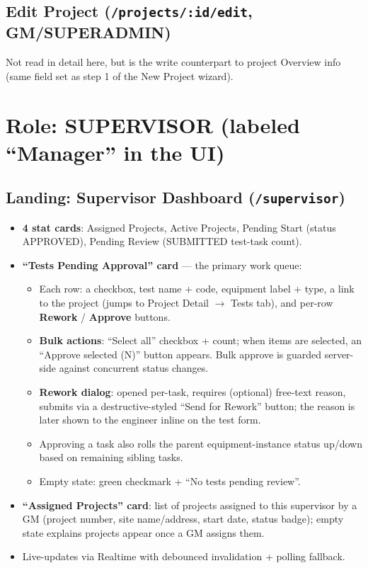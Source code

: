 \documentclass[11pt]{article}
\begin{document}
\subsection{Edit Project (\texttt{/projects/:id/edit}, GM/SUPERADMIN)}
Not read in detail here, but is the write counterpart to project Overview info (same field set as
step 1 of the New Project wizard).

\section{Role: SUPERVISOR (labeled ``Manager'' in the UI)}

\subsection{Landing: Supervisor Dashboard (\texttt{/supervisor})}
\begin{itemize}[nosep]
  \item \textbf{4 stat cards}: Assigned Projects, Active Projects, Pending Start (status
    APPROVED), Pending Review (SUBMITTED test-task count).
  \item \textbf{``Tests Pending Approval'' card} --- the primary work queue:
  \begin{itemize}[nosep]
    \item Each row: a checkbox, test name + code, equipment label + type, a link to the project
      (jumps to Project Detail $\to$ Tests tab), and per-row \textbf{Rework} / \textbf{Approve}
      buttons.
    \item \textbf{Bulk actions}: ``Select all'' checkbox + count; when items are selected, an
      ``Approve selected (N)'' button appears. Bulk approve is guarded server-side against
      concurrent status changes.
    \item \textbf{Rework dialog}: opened per-task, requires (optional) free-text reason, submits
      via a destructive-styled ``Send for Rework'' button; the reason is later shown to the
      engineer inline on the test form.
    \item Approving a task also rolls the parent equipment-instance status up/down based on
      remaining sibling tasks.
    \item Empty state: green checkmark + ``No tests pending review''.
  \end{itemize}
  \item \textbf{``Assigned Projects'' card}: list of projects assigned to this supervisor by a GM
    (project number, site name/address, start date, status badge); empty state explains projects
    appear once a GM assigns them.
  \item Live-updates via Realtime with debounced invalidation + polling fallback.
\end{itemize}
\end{document}

